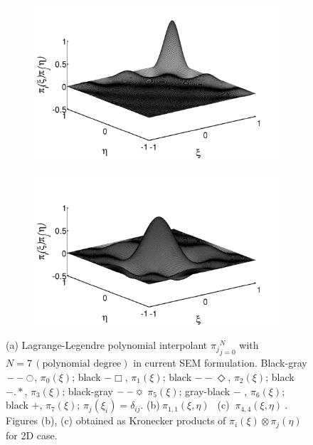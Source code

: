 \documentclass[times]{fldauth}
\begin{document}
\begin{appendices}
\begin{figure}
\begin{subfigure}[b]{0.65\textwidth}
                \caption{}
                \label{fig:poly1}
        \end{subfigure}
          \begin{subfigure}[b]{0.45\textwidth}
         \centering
                \includegraphics[width=\linewidth]{Figure/legpoly_2D1.pdf}
                 \caption{}
                 \label{fig:poly2}
         \end{subfigure}%
         \begin{subfigure}[b]{0.45\textwidth}
         \centering
                \includegraphics[width=\linewidth]{Figure/legpoly_2D2.pdf}
                 \caption{}
                 \label{fig:poly3}
         \end{subfigure}
        \caption{(a) Lagrange-Legendre polynomial interpolant ${\pi_j}_{j=0}^{N}$ with $N = 7\,(\mbox{polynomial degree})$ in current SEM formulation. Black-gray $--\ocircle$,   $\pi_0(\xi)$;  black $-\Box$,  $\pi_1(\xi)$;  black $--\Diamond$,  $\pi_2(\xi)$;  black $-.*$,  $\pi_3(\xi)$;  black-gray $--\davidsstar$  $\pi_5(\xi)$; gray-black $-$ ,  $\pi_6(\xi)$; black $+$, $\pi_7(\xi)$; $\pi_j(\xi_i) = \delta_{ij}$. (b)$\  \pi_{1,1}(\xi,\eta) \ \ $ (c) $\  \pi_{4,4}(\xi,\eta) \ $. Figures (b), (c) obtained as Kronecker products of $\pi_{i}(\xi)\otimes \pi_{j}(\eta)$ for 2D case.}\label{fig:figure_legpoly1}

\end{figure}
\end{appendices}
\end{document}
